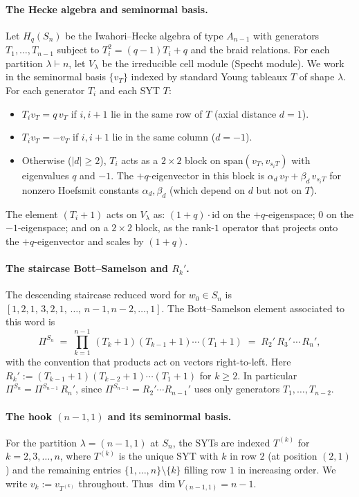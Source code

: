 \documentclass[11pt]{article}
\theoremstyle{definition}
\begin{document}
\paragraph{The Hecke algebra and seminormal basis.}
Let $H_q(S_n)$ be the Iwahori--Hecke algebra of type $A_{n-1}$ with
generators $T_1, \ldots, T_{n-1}$ subject to $T_i^2 = (q-1)T_i + q$ and
the braid relations. For each partition $\lambda \vdash n$, let
$V_\lambda$ be the irreducible cell module (Specht module). We work
in the seminormal basis $\{v_T\}$ indexed by standard Young tableaux $T$
of shape $\lambda$. For each generator $T_i$ and each SYT $T$:
\begin{itemize}[topsep=0.3em,itemsep=0.2em,leftmargin=2em]
\item $T_i v_T = q\, v_T$ if $i, i{+}1$ lie in the same row of $T$
  (axial distance $d = 1$).
\item $T_i v_T = -v_T$ if $i, i{+}1$ lie in the same column ($d = -1$).
\item Otherwise ($|d| \ge 2$), $T_i$ acts as a $2 \times 2$ block on
  $\mathrm{span}(v_T, v_{s_i T})$ with eigenvalues $q$ and $-1$. The
  $+q$-eigenvector in this block is
  $\alpha_d\, v_T + \beta_d\, v_{s_i T}$ for nonzero Hoefsmit constants
  $\alpha_d, \beta_d$ (which depend on $d$ but not on $T$).
\end{itemize}
The element $(T_i + 1)$ acts on $V_\lambda$ as: $(1{+}q)\cdot \mathrm{id}$
on the $+q$-eigenspace; $0$ on the $-1$-eigenspace; and on a $2\times 2$
block, as the rank-$1$ operator that projects onto the
$+q$-eigenvector and scales by $(1{+}q)$.

\paragraph{The staircase Bott--Samelson and $R_k'$.}
The descending staircase reduced word for $w_0\in S_n$ is
$[1, 2, 1,\, 3, 2, 1,\, \ldots,\, n{-}1, n{-}2, \ldots, 1]$.
The Bott--Samelson element associated to this word is
\[
   \Pi^{S_n} \;=\; \prod_{k=1}^{n-1}\,(T_k{+}1)(T_{k-1}{+}1)\cdots(T_1{+}1)
              \;=\; R_2'\,R_3'\,\cdots\,R_n',
\]
with the convention that products act on vectors right-to-left.
Here $R_k' := (T_{k-1}{+}1)(T_{k-2}{+}1)\cdots(T_1{+}1)$ for $k \ge 2$.
In particular $\Pi^{S_n} = \Pi^{S_{n-1}}\,R_n'$, since
$\Pi^{S_{n-1}}=R_2'\cdots R_{n-1}'$ uses only generators
$T_1, \ldots, T_{n-2}$.

\paragraph{The hook $(n-1,1)$ and its seminormal basis.}
For the partition $\lambda = (n-1, 1)$ at $S_n$, the SYTs are indexed
$T^{(k)}$ for $k = 2, 3, \ldots, n$, where $T^{(k)}$ is the unique SYT
with $k$ in row $2$ (at position $(2,1)$) and the remaining entries
$\{1, \ldots, n\} \setminus \{k\}$ filling row $1$ in increasing order.
We write $v_k := v_{T^{(k)}}$ throughout. Thus
$\dim V_{(n-1,1)} = n - 1$.
\end{document}
